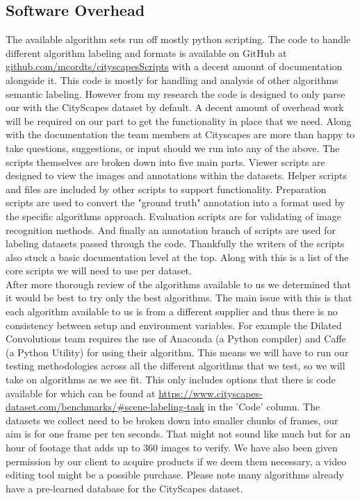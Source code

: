 \documentclass[10pt,draftclsnofoot,onecolumn,journal,compsoc]{IEEEtran}
\begin{document}
\subsection{Software Overhead}
The available algorithm sets run off mostly python scripting. 
The code to handle different algorithm labeling and formats is available on GitHub at \url{github.com/mcordts/cityscapesScripts} with a decent amount of documentation alongside it. 
This code is mostly for handling and analysis of other algorithms semantic labeling. However from my research the code is designed to only parse our with the CityScapes dataset by default. 
A decent amount of overhead work will be required on our part to get the functionality in place that we need.
Along with the documentation the team members at Cityscapes are more than happy to take questions, suggestions, or input should we run into any of the above.
The scripts themselves are broken down into five main parts. 
Viewer scripts are designed to view the images and annotations within the datasets. 
Helper scripts and files are included by other scripts to support functionality. 
Preparation scripts are used to convert the "ground truth" annotation into a format used by the specific algorithms approach. 
Evaluation scripts are for validating of image recognition methods. 
And finally an annotation branch of scripts are used for labeling datasets passed through the code.
Thankfully the writers of the scripts also stuck a basic documentation level at the top. Along with this is a list of the core scripts we will need to use per dataset.\\
After more thorough review of the algorithms available to us we determined that it would be best to try only the best algorithms. 
The main issue with this is that each algorithm available to us is from a different supplier and thus there is no consistency between setup and environment variables. 
For example the Dilated Convolutions team requires the use of Anaconda (a Python compiler) and Caffe (a Python Utility) for using their algorithm. 
This means we will have to run our testing methodologies across all the different algorithms that we test, so we will take on algorithms as we see fit. 
This only includes options that there is code available for which can be found at \url{https://www.cityscapes-dataset.com/benchmarks/#scene-labeling-task} in the 'Code' column. 
The datasets we collect need to be broken down into smaller chunks of frames, our aim is for one frame per ten seconds.
That might not sound like much but for an hour of footage that adds up to 360 images to verify.
We have also been given permission by our client to acquire products if we deem them necessary, a video editing tool might be a possible purchase. 
Please note many algorithms already have a pre-learned database for the CityScapes dataset. 
\end{document}
